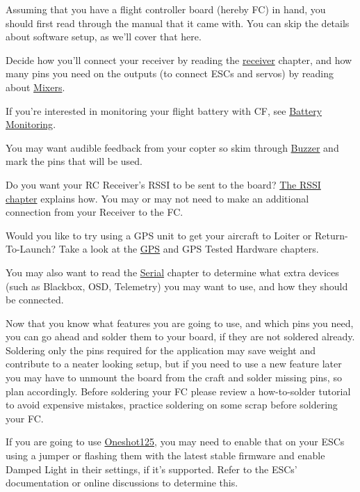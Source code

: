 \begin{DoxyItemize}
\item Assuming that you have a flight controller board (hereby F\+C) in hand, you should first read through the manual that it came with. You can skip the details about software setup, as we'll cover that here.
\item Decide how you'll connect your receiver by reading the \hyperlink{Rx_8md}{receiver} chapter, and how many pins you need on the outputs (to connect E\+S\+Cs and servos) by reading about \hyperlink{Mixer_8md}{Mixers}.
\item If you're interested in monitoring your flight battery with C\+F, see \hyperlink{Battery_8md}{Battery Monitoring}.
\item You may want audible feedback from your copter so skim through \hyperlink{Buzzer_8md}{Buzzer} and mark the pins that will be used.
\item Do you want your R\+C Receiver's R\+S\+S\+I to be sent to the board? \hyperlink{Rssi_8md}{The R\+S\+S\+I chapter} explains how. You may or may not need to make an additional connection from your Receiver to the F\+C.
\item Would you like to try using a G\+P\+S unit to get your aircraft to Loiter or Return-\/\+To-\/\+Launch? Take a look at the \hyperlink{Gps_8md}{G\+P\+S} and G\+P\+S Tested Hardware chapters.
\item You may also want to read the \hyperlink{Serial_8md}{Serial} chapter to determine what extra devices (such as Blackbox, O\+S\+D, Telemetry) you may want to use, and how they should be connected.
\item Now that you know what features you are going to use, and which pins you need, you can go ahead and solder them to your board, if they are not soldered already. Soldering only the pins required for the application may save weight and contribute to a neater looking setup, but if you need to use a new feature later you may have to unmount the board from the craft and solder missing pins, so plan accordingly. Before soldering your F\+C please review a how-\/to-\/solder tutorial to avoid expensive mistakes, practice soldering on some scrap before soldering your F\+C.
\item If you are going to use \hyperlink{Oneshot_8md}{Oneshot125}, you may need to enable that on your E\+S\+Cs using a jumper or flashing them with the latest stable firmware and enable Damped Light in their settings, if it's supported. Refer to the E\+S\+Cs' documentation or online discussions to determine this.
\end{DoxyItemize}

